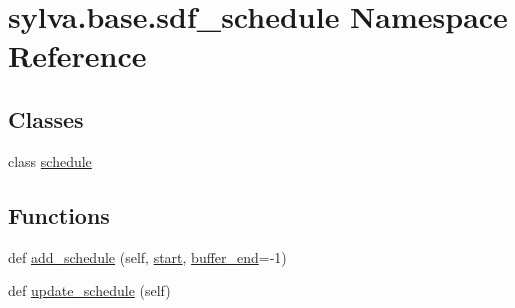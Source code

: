 \hypertarget{namespacesylva_1_1base_1_1sdf__schedule}{}\section{sylva.\+base.\+sdf\+\_\+schedule Namespace Reference}
\label{namespacesylva_1_1base_1_1sdf__schedule}
\subsection*{Classes}
\begin{DoxyCompactItemize}
\item 
class \hyperlink{classsylva_1_1base_1_1sdf__schedule_1_1schedule}{schedule}
\end{DoxyCompactItemize}
\subsection*{Functions}
\begin{DoxyCompactItemize}
\item 
def \hyperlink{namespacesylva_1_1base_1_1sdf__schedule_af3610c48a92beceb09c2924f3554663e}{add\+\_\+schedule} (self, \hyperlink{namespacesylva_1_1base_1_1sdf__schedule_a3f7278d0453c1de2ab036bd4d0cc6c34}{start}, \hyperlink{namespacesylva_1_1base_1_1sdf__schedule_a04c239d8283f1618f063ef92036c8c4c}{buffer\+\_\+end}=-\/1)
\item 
def \hyperlink{namespacesylva_1_1base_1_1sdf__schedule_a529fa8c65b064ae4c5ac6355d12483fa}{update\+\_\+schedule} (self)
\end{DoxyCompactItemize}
